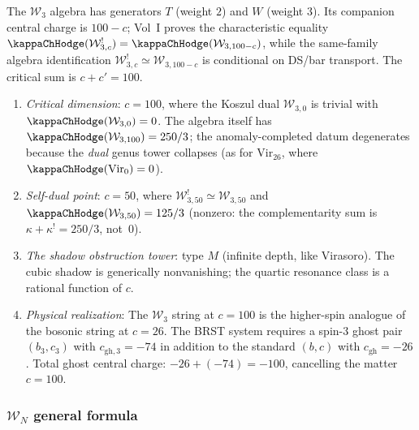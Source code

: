 \begin{computation}
The $\mathcal{W}_3$ algebra has generators $T$ (weight $2$)
and $W$ (weight $3$). Its companion central charge is
$100-c$; Vol~I proves the characteristic equality
$\kappaChHodge(\mathcal{W}_{3,c}^!)=\kappaChHodge(\mathcal{W}_{3,100-c})$,
while the same-family algebra identification
$\mathcal{W}_{3,c}^! \simeq \mathcal{W}_{3,100-c}$ is conditional
on DS/bar transport. The critical sum is $c+c'=100$.

\begin{enumerate}[label=\textup{(\roman*)}]
\item \emph{Critical dimension}: $c = 100$, where the Koszul dual
 $\mathcal{W}_{3,0}$ is trivial with
 $\kappaChHodge(\mathcal{W}_{3,0}) = 0$.
 The algebra itself has $\kappaChHodge(\mathcal{W}_{3,100}) = 250/3$;
 the anomaly-completed datum degenerates because the
 \emph{dual} genus tower collapses (as for
 $\mathrm{Vir}_{26}$, where $\kappaChHodge(\mathrm{Vir}_0) = 0$).
\item \emph{Self-dual point}: $c = 50$, where
 $\mathcal{W}_{3,50}^! \simeq \mathcal{W}_{3,50}$
 and $\kappaChHodge(\mathcal{W}_{3,50}) = 125/3$
 (nonzero: the complementarity sum is
 $\kappa + \kappa^! = 250/3$, not~$0$).
\item \emph{The shadow obstruction tower}: type $M$ (infinite depth,
 like Virasoro).
 The cubic shadow is generically nonvanishing; the
 quartic resonance class is a rational function of $c$.
\item \emph{Physical realization}: The $\mathcal{W}_3$
 string at $c = 100$ is the higher-spin analogue of the
 bosonic string at $c = 26$. The BRST system requires a
 spin-$3$ ghost pair $(b_3, c_3)$ with
 $c_{\mathrm{gh},3} = -74$ in addition to the standard
 $(b, c)$ with $c_{\mathrm{gh}} = -26$.
 Total ghost central charge: $-26 + (-74) = -100$,
 cancelling the matter $c = 100$.
\end{enumerate}
\end{computation}

\subsubsection{$\mathcal{W}_N$ general formula}

